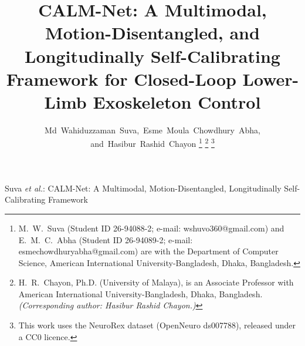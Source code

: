 \documentclass[journal]{IEEEtran}
\begin{document}
\title{CALM-Net: A Multimodal, Motion-Disentangled, and Longitudinally
Self-Calibrating Framework for Closed-Loop Lower-Limb Exoskeleton Control}

\author{Md~Wahiduzzaman~Suva,~Esme~Moula~Chowdhury~Abha,
and~Hasibur~Rashid~Chayon
\thanks{M.~W.~Suva (Student ID 26-94088-2; e-mail: \mbox{wshuvo360@gmail.com}) and
E.~M.~C.~Abha (Student ID 26-94089-2; e-mail: \mbox{esmechowdhuryabha@gmail.com}) are
with the Department of Computer Science, American International University-Bangladesh,
Dhaka, Bangladesh.}
\thanks{H.~R.~Chayon, Ph.D. (University of Malaya), is an Associate Professor with
American International University-Bangladesh, Dhaka, Bangladesh.
\emph{(Corresponding author: Hasibur Rashid Chayon.)}}
\thanks{This work uses the NeuroRex dataset (OpenNeuro ds007788), released under
a CC0 licence.}}

%
{Suva \MakeLowercase{\textit{et al.}}: CALM-Net: A Multimodal, Motion-Disentangled, Longitudinally Self-Calibrating Framework}
\maketitle
\end{document}
